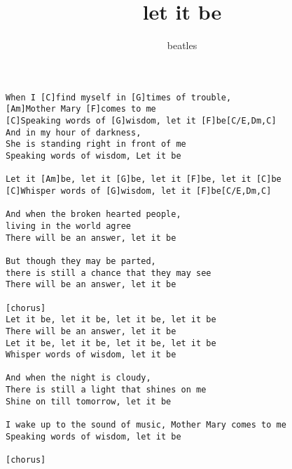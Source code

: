 \author{beatles}
\title{let it be}
\maketitle
\begin{verbatim}
When I [C]find myself in [G]times of trouble,
[Am]Mother Mary [F]comes to me
[C]Speaking words of [G]wisdom, let it [F]be[C/E,Dm,C]
And in my hour of darkness,
She is standing right in front of me
Speaking words of wisdom, Let it be

Let it [Am]be, let it [G]be, let it [F]be, let it [C]be
[C]Whisper words of [G]wisdom, let it [F]be[C/E,Dm,C]

And when the broken hearted people,
living in the world agree
There will be an answer, let it be

But though they may be parted,
there is still a chance that they may see
There will be an answer, let it be

[chorus]
Let it be, let it be, let it be, let it be
There will be an answer, let it be
Let it be, let it be, let it be, let it be
Whisper words of wisdom, let it be
				
And when the night is cloudy, 
There is still a light that shines on me
Shine on till tomorrow, let it be

I wake up to the sound of music, Mother Mary comes to me
Speaking words of wisdom, let it be

[chorus]
\end{verbatim}